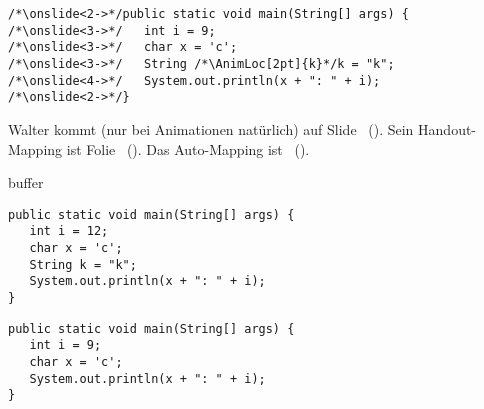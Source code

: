 \documentclass{beamer}
\begin{document}
\begin{frame}[fragile]
\begin{verbatim}
/*\onslide<2->*/public static void main(String[] args) {
/*\onslide<3->*/   int i = 9;
/*\onslide<3->*/   char x = 'c';
/*\onslide<3->*/   String /*\AnimLoc[2pt]{k}*/k = "k";
/*\onslide<4->*/   System.out.println(x + ": " + i);
/*\onslide<2->*/}
\end{verbatim}
\endAnimateCode
Walter kommt (nur bei Animationen natürlich) auf Slide \WalterAnim~(). Sein Handout-Mapping ist Folie \WalterHandout~(). Das Auto-Mapping ist \Walter~(). %
\end{frame}

\begin{frame}
   buffer
\end{frame}

\begin{frame}[fragile]
\begin{verbatim}
public static void main(String[] args) {
   int i = 12;
   char x = 'c';
   String k = "k";
   System.out.println(x + ": " + i);
}
\end{verbatim}
\endAnimateCode
\end{frame}

\begin{frame}[fragile]
\begin{verbatim}
public static void main(String[] args) {
   int i = 9;
   char x = 'c';
   System.out.println(x + ": " + i);
}
\end{verbatim}
\end{frame}
\end{document}
